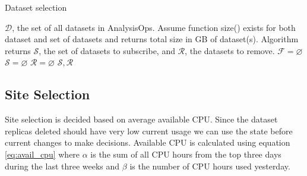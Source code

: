 \documentclass[11pt,a4page]{article}
\begin{document}
    \begin{algorithm} 
      \caption{Dataset selection} \label{alg:data_sel}
      \footnotesize
      \begin{algorithmic}[1]
        \REQUIRE $\mathcal{D}$, the set of all datasets in AnalysisOps. Assume function size() exists for both dataset and set of datasets and returns total size in GB of dataset(s). Algorithm returns $\mathcal{S}$, the set of datasets to subscribe, and $\mathcal{R}$, the datasets to remove.
        \STATE $\mathcal{F} = \varnothing$
         \label{for1}
        \ENDFOR
        \STATE $\mathcal{S} = \varnothing$
        \STATE $\mathcal{R} = \varnothing$
        \LOOP \label{loop1}
        \ENDLOOP
        \RETURN $\mathcal{S}, \mathcal{R}$
      \end{algorithmic}
    \end{algorithm}

  \subsection{Site Selection}
    Site selection is decided based on average available CPU. Since the dataset replicas deleted should have very low current usage we can use the state before current changes to make decisions. Available CPU is calculated using equation \ref{eq:avail_cpu} where $\alpha$ is the sum of all CPU hours from the top three days during the last three weeks and $\beta$ is the number of CPU hours used yesterday.
\end{document}
